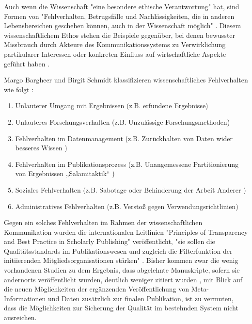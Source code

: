 Auch wenn die Wissenschaft "eine besondere ethische Verantwortung" hat, sind Formen von "Fehlverhalten, Betrugsfälle und Nachlässigkeiten, die in anderen Lebensbereichen geschehen können, auch in der Wissenschaft möglich" \cite{wr_2015_wissenschaft_integritaet}. Diesem wissenschaftlichem Ethos stehen die Beispiele gegenüber, bei denen bewusster Missbrauch durch Akteure des Kommunikationssystems zu Verwirklichung partikularer Interessen oder konkreten Einfluss auf wirtschaftliche Aspekte geführt haben \cite{Luescher_2014}  \cite{binswanger_2014_excellence} \cite{Beall_2012}.

Margo Bargheer und Birgit Schmidt klassifizieren wissenschaftliches Fehlverhalten wie folgt \cite{Bargheer_2015}:
\begin{enumerate}
\item Unlauterer Umgang mit Ergebnissen (z.B. erfundene Ergebnisse)
\item Unlauteres Forschungsverhalten (z.B. Unzulässige Forschungsmethoden)
\item Fehlverhalten im Datenmanagement (z.B. Zurückhalten von Daten wider besseres Wissen )
\item Fehlverhalten im Publikationsprozess (z.B. Unangemessene Partitionierung von Ergebnissen „Salamitaktik“  \cite{binswanger_2014_excellence})
\item Soziales Fehlverhalten (z.B. Sabotage oder Behinderung der Arbeit Anderer )
\item Administratives Fehlverhalten (z.B. Verstoß gegen Verwendungsrichtlinien)
\end{enumerate}

Gegen ein solches Fehlverhalten im Rahmen der wissenschaftlichen Kommunikation wurden die internationalen Leitlinien "Principles of Transparency and Best Practice in Scholarly Publishing" \cite{oaspa_principles_2013} veröffentlicht, "sie sollen die Qualitätsstandards im Publikationswesen und zugleich die Filterfunktion der initiierenden Mitgliedsorganisationen stärken" \cite{Bargheer_2015}. Bisher kommen zwar die wenig vorhandenen Studien zu dem Ergebnis, dass abgelehnte Manuskripte, sofern sie andernorts veröffentlicht wurden, deutlich weniger zitiert wurden \cite{Hornbostel_1997}, mit Blick auf die neuen Möglichkeiten der ergänzenden Veröffentlichung von Meta-Informationen und Daten zusätzlich zur finalen Publikation, ist zu vermuten, dass die Möglichkeiten zur Sicherung der Qualität im bestehnden System nicht ausreichen.

